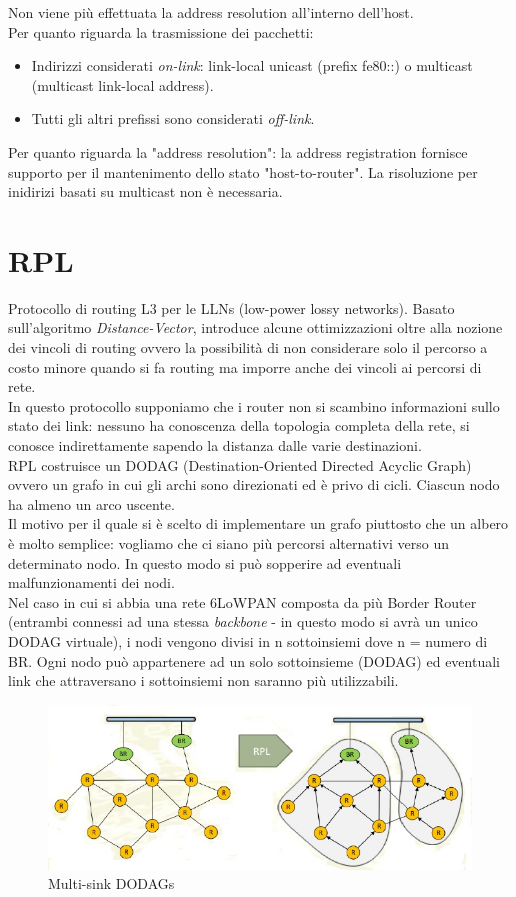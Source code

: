 \documentclass{article}
\begin{document}
Non viene più effettuata la address resolution all'interno dell'host. \\ Per quanto riguarda la trasmissione dei pacchetti:
\begin{itemize}
    \item Indirizzi considerati \textit{on-link}: link-local unicast (prefix fe80::) o multicast (multicast link-local address).
    \item Tutti gli altri prefissi sono considerati \textit{off-link}.
\end{itemize}
Per quanto riguarda la "address resolution": la address registration fornisce supporto per il mantenimento dello stato "host-to-router". La risoluzione per inidirizi basati su multicast non è necessaria.
\newpage

\section{RPL}
Protocollo di routing L3 per le LLNs (low-power lossy networks). Basato sull'algoritmo \textit{Distance-Vector}, introduce alcune ottimizzazioni oltre alla nozione dei vincoli di routing ovvero la possibilità di non considerare solo il percorso a costo minore quando si fa routing ma imporre anche dei vincoli ai percorsi di rete. \\
In questo protocollo supponiamo che i router non si scambino informazioni sullo stato dei link: nessuno ha conoscenza della topologia completa della rete, si conosce indirettamente sapendo la distanza dalle varie destinazioni. \\
RPL costruisce un DODAG (Destination-Oriented Directed Acyclic Graph) ovvero un grafo in cui gli archi sono direzionati ed è privo di cicli. Ciascun nodo ha almeno un arco uscente. \\
Il motivo per il quale si è scelto di implementare un grafo piuttosto che un albero è molto semplice: vogliamo che ci siano più percorsi alternativi verso un determinato nodo. In questo modo si può sopperire ad eventuali malfunzionamenti dei nodi. \\
Nel caso in cui si abbia una rete 6LoWPAN composta da più Border Router (entrambi connessi ad una stessa \textit{backbone} - in questo modo si avrà un unico DODAG virtuale), i nodi vengono divisi in n sottoinsiemi dove n = numero di BR. Ogni nodo può appartenere ad un solo sottoinsieme (DODAG) ed eventuali link che attraversano i sottoinsiemi non saranno più utilizzabili.

\begin{figure}[H]
\centering
\includegraphics[scale=0.4]{figures/dodag.jpg}
\caption{Multi-sink DODAGs}
\end{figure}
\end{document}
